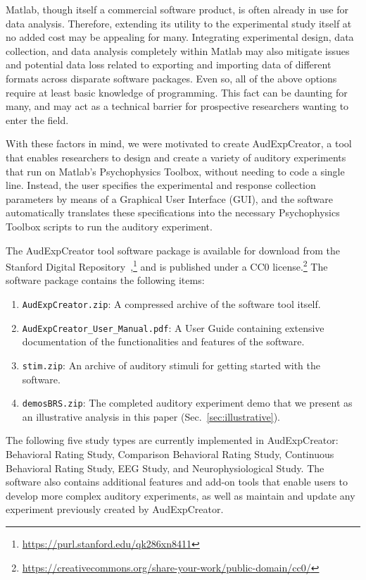 \documentclass[preprint,12pt, a4paper]{elsarticle}
\begin{document}
Matlab, though itself a commercial software product, is often already in use for data analysis. Therefore, extending its utility to the experimental study itself at no added cost may be appealing for many.
Integrating experimental design, data collection, and data analysis completely within Matlab may also mitigate issues and potential data loss related to exporting and importing data of different formats across disparate software packages. 
Even so, all of the above options require at least basic knowledge of programming. This fact can be daunting for many, and may act as a technical barrier for prospective researchers wanting to enter the field. 

With these factors in mind, we were motivated to create AudExpCreator, a tool that enables researchers to design and create a variety of auditory experiments that run on Matlab's Psychophysics Toolbox, without needing to code a single line. Instead, the user specifies the experimental and response collection parameters by means of a Graphical User Interface (GUI), and the software automatically translates these specifications into the necessary Psychophysics Toolbox scripts to run the auditory experiment.

The AudExpCreator tool software package is available for download from the Stanford Digital Repository~\cite{nguyen2017AECSDR},\footnote{\url{https://purl.stanford.edu/qk286xn8411}} and is published under a CC0 license.\footnote{\url{https://creativecommons.org/share-your-work/public-domain/cc0/}} The software package contains the following items: 
\begin{enumerate}
    \item \texttt{AudExpCreator.zip}: A compressed archive of the software tool itself.
    \item \texttt{AudExpCreator\_User\_Manual.pdf}: A User Guide containing extensive documentation of the functionalities and features of the software.
    \item \texttt{stim.zip}: An archive of auditory stimuli for getting started with the software.
    \item \texttt{demosBRS.zip}: The completed auditory experiment demo that we present as an illustrative analysis in this paper (Sec.~\ref{sec:illustrative}). 
\end{enumerate}
The following five study types are currently implemented in AudExpCreator: Behavioral Rating Study, Comparison Behavioral Rating Study, Continuous Behavioral Rating Study, EEG Study, and Neurophysiological Study. The software also contains additional features and add-on tools that enable users to develop more complex auditory experiments, as well as maintain and update any  experiment previously created by AudExpCreator. 
\end{document}
